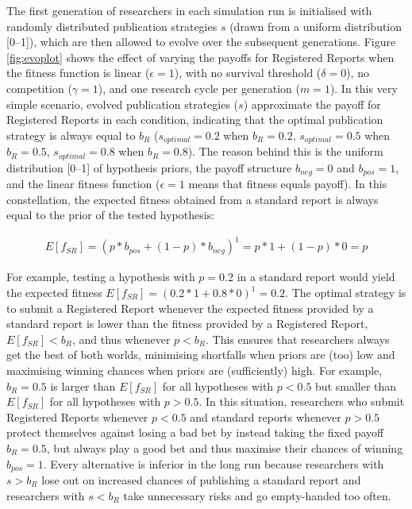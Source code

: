 \documentclass[
  british,
  a4paper,
  ,man,mask,floatsintext]{apa6}
\begin{document}
The first generation of researchers in each simulation run is initialised with randomly distributed publication strategies \(s\) (drawn from a uniform distribution {[}0--1{]}), which are then allowed to evolve over the subsequent generations.
Figure \ref{fig:evoplot} shows the effect of varying the payoffs for Registered Reports when the fitness function is linear (\(\epsilon = 1\)), with no survival threshold (\(\delta = 0\)), no competition (\(\gamma = 1\)), and one research cycle per generation (\(m = 1\)).
In this very simple scenario, evolved publication strategies (\(s\)) approximate the payoff for Registered Reports in each condition, indicating that the optimal publication strategy is always equal to \(b_{R}\) (\(s_{optimal} = 0.2\) when \(b_{R} = 0.2\), \(s_{optimal} = 0.5\) when \(b_{R} = 0.5\), \(s_{optimal} = 0.8\) when \(b_{R} = 0.8\)).
The reason behind this is the uniform distribution {[}0--1{]} of hypothesis priors, the payoff structure \(b_{neg} = 0\) and \(b_{pos} = 1\), and the linear fitness function (\(\epsilon = 1\) means that fitness equals payoff).
In this constellation, the expected fitness obtained from a standard report is always equal to the prior of the tested hypothesis:

\begin{align}
E[f_{SR}] = (p * b_{pos} + (1-p) * b_{neg})^1 = p * 1 +  (1-p) * 0 = p
\end{align}

For example, testing a hypothesis with \(p = 0.2\) in a standard report would yield the expected fitness \(E[f_{SR}] = (0.2 * 1 +  0.8 * 0)^1 = 0.2\).
The optimal strategy is to submit a Registered Report whenever the expected fitness provided by a standard report is lower than the fitness provided by a Registered Report, \(E[f_{SR}] < b_{R}\), and thus whenever \(p < b_{R}\).
This ensures that researchers always get the best of both worlds, minimising shortfalls when priors are (too) low and maximising winning chances when priors are (sufficiently) high.
For example, \(b_{R} = 0.5\) is larger than \(E[f_{SR}]\) for all hypotheses with \(p < 0.5\) but smaller than \(E[f_{SR}]\) for all hypotheses with \(p > 0.5\).
In this situation, researchers who submit Registered Reports whenever \(p<0.5\) and standard reports whenever \(p>0.5\) protect themselves against losing a bad bet by instead taking the fixed payoff \(b_{R} = 0.5\), but always play a good bet and thus maximise their chances of winning \(b_{pos} = 1\).
Every alternative is inferior in the long run because researchers with \(s > b_{R}\) lose out on increased chances of publishing a standard report and researchers with \(s < b_{R}\) take unnecessary risks and go empty-handed too often.
\end{document}
